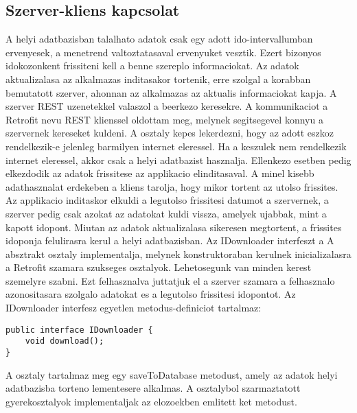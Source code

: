 \subsection*{Szerver-kliens kapcsolat}
\label{serverclient}
A helyi adatbazisban talalhato adatok csak egy adott ido-intervallumban ervenyesek, a menetrend valtoztatasaval ervenyuket vesztik. 
Ezert bizonyos idokozonkent frissiteni kell a benne szereplo informaciokat. 
Az adatok aktualizalasa az alkalmazas inditasakor tortenik, erre szolgal a korabban bemutatott szerver, ahonnan az alkalmazas az aktualis informaciokat kapja.
A szerver REST uzenetekkel valaszol a beerkezo keresekre.
A kommunikaciot a Retrofit nevu REST klienssel oldottam meg, melynek segitsegevel konnyu a szervernek kereseket kuldeni.
A  osztaly kepes lekerdezni, hogy az adott eszkoz rendelkezik-e jelenleg barmilyen internet eleressel. 
Ha a keszulek nem rendelkezik internet eleressel, akkor csak a helyi adatbazist hasznalja.
Ellenkezo esetben pedig elkezdodik az adatok frissitese az applikacio elinditasaval.
A minel kisebb adathasznalat erdekeben a kliens tarolja, hogy mikor tortent az utolso frissites. 
Az applikacio inditaskor elkuldi a legutolso frissitesi datumot a szervernek, a szerver pedig csak azokat az adatokat kuldi vissza, amelyek ujabbak, mint a kapott idopont.
Miutan az adatok aktualizalasa sikeresen megtortent, a frissites idoponja felulirasra kerul a helyi adatbazisban.
Az IDownloader interfeszt a A  absztrakt osztaly implementalja, melynek konstruktoraban kerulnek inicializalasra a Retrofit szamara szukseges osztalyok.
Lehetosegunk van minden kerest szemelyre szabni. 
Ezt felhasznalva juttatjuk el a szerver szamara a felhasznalo azonositasara szolgalo adatokat es a legutolso frissitesi idopontot.
Az IDownloader interfesz egyetlen metodus-definiciot tartalmaz:
\begin{lstlisting}
public interface IDownloader {
    void download();
}
\end{lstlisting}
A  osztaly tartalmaz meg egy saveToDatabase metodust, amely az adatok helyi adatbazisba torteno lementesere alkalmas.
A  osztalybol szarmaztatott gyerekosztalyok implementaljak az elozoekben emlitett ket metodust.

